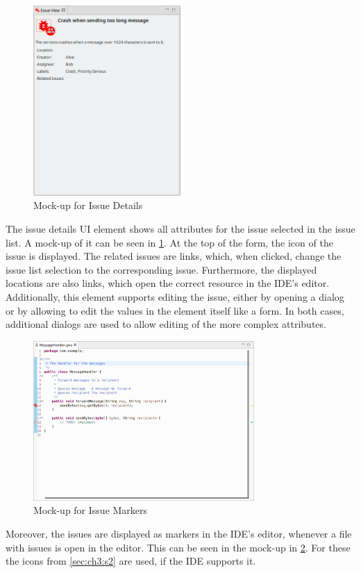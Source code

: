 \begin{figure}[!h]
	\centering
	\includegraphics[width=0.5\textwidth]{graphics/concept_mockup_issueDetails.png}
	\caption{Mock-up for Issue Details}
	\label{fig:c3:mockup_issueDetails}
\end{figure}
The issue details \gls{UI} element shows all attributes for the issue selected in the issue list.
A mock-up of it can be seen in \cref{fig:c3:mockup_issueDetails}.
At the top of the form, the icon of the issue is displayed.
The related issues are links, which, when clicked, change the issue list selection to the corresponding issue.
Furthermore, the displayed locations are also links, which open the correct resource in the \gls{IDE}'s editor.
Additionally, this element supports editing the issue, either by opening a dialog or by allowing to edit the values in the element itself like a form.
In both cases, additional dialogs are used to allow editing of the more complex attributes. 

\begin{figure}[!h]
	\centering
	\includegraphics[width=0.75\textwidth]{graphics/concept_mockup_issueMarker.png}
	\caption{Mock-up for Issue Markers}
	\label{fig:c3:mockup_issueMarkers}
\end{figure}
Moreover, the issues are displayed as markers in the \gls{IDE}'s editor, whenever a file with issues is open in the editor.
This can be seen in the mock-up in \cref{fig:c3:mockup_issueMarkers}. 
For these the icons from \cref{sec:ch3:s2} are used, if the \gls{IDE} supports it.

